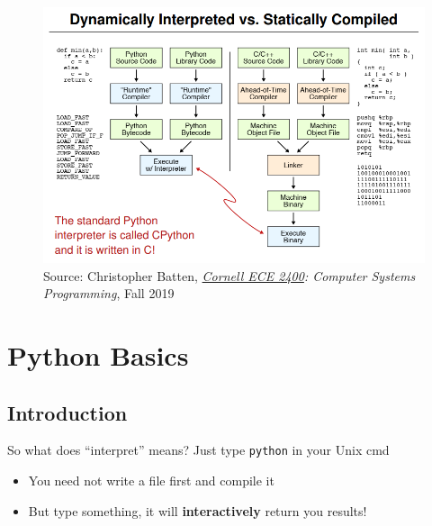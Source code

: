 \documentclass{../TexTemplate/myslide}
\begin{document}
\begin{frame}
\begin{figure}
\centering
\includegraphics[width=0.9\linewidth]{fig/cpython.png}
\caption*{\scriptsize Source: Christopher Batten, \emph{\href{https://www.csl.cornell.edu/courses/ece2400/handouts/ece2400-overview.pdf}{Cornell ECE 2400}: Computer Systems Programming}, Fall 2019}
\end{figure}
\end{frame}

\section{Python Basics}
\begin{frame}
\sectionpage
\end{frame}

\subsection{Introduction}
\begin{frame}[fragile]{So what does ``interpret'' means?}
Just type \verb'python' in your Unix cmd
\begin{itemize}
	\item You need not write a file first and compile it
	\item But type something, it will \textbf{interactively} return you results!
\end{itemize}
\end{frame}
\end{document}
